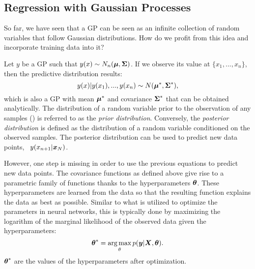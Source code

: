 \subsection{Regression with Gaussian Processes}
So far, we have seen that a GP can be seen as an infinite collection of random variables that follow Gaussian distributions. How do we profit from this idea and incorporate training data into it?

Let $y$ be a GP such that $y(x)\sim N_n(\boldsymbol{\mu}, \boldsymbol{\Sigma})$. If we observe its value at $\{ x_1,...,x_n\}$, then the predictive distribution results:
\begin{equation}
    y(x)|y(x_1),...,y(x_n) \sim N(\boldsymbol{\mu}^*, \boldsymbol{\Sigma}^*),
    \label{eq:gp_posterior}
\end{equation}
which is also a GP with mean $\boldsymbol{\mu}^*$ and covariance $\boldsymbol{\Sigma}^*$ that can be obtained analytically. The distribution of a random variable prior to the observation of any samples () is referred to as the \textit{prior distribution}. Conversely, the \textit{posterior distribution} is defined as the distribution of a random variable conditioned on the observed samples. The posterior distribution can be used to predict new data points, \ie~$y(x_{n+1}|\boldsymbol{x}_N)$.

However, one step is missing in order to use the previous equations to predict new data points. The covariance functions as defined above give rise to a parametric family of functions thanks to the hyperparameters $\boldsymbol{\theta}$. These hyperparameters are learned from the data so that the resulting function explains the data as best as possible. Similar to what is utilized to optimize the parameters in neural networks, this is typically done by maximizing the logarithm of the marginal likelihood of the observed data given the hyperparameters:
\begin{equation*}
    \boldsymbol{\theta}^* = \operatorname*{arg\,max}_\theta p(\boldsymbol{y}|\boldsymbol{X},\boldsymbol{\theta}).
\end{equation*}
$\boldsymbol{\theta}^*$ are the values of the hyperparameters after optimization.


